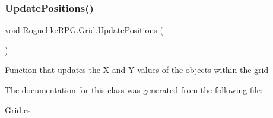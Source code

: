 \subsubsection{\texorpdfstring{Update\+Positions()}{UpdatePositions()}}
{\footnotesize\ttfamily void Roguelike\+R\+P\+G.\+Grid.\+Update\+Positions (\begin{DoxyParamCaption}{ }\end{DoxyParamCaption})\hspace{0.3cm}{\ttfamily [inline]}}



Function that updates the X and Y values of the objects within the grid 



The documentation for this class was generated from the following file\+:\begin{DoxyCompactItemize}
\item 
Grid.\+cs\end{DoxyCompactItemize}
